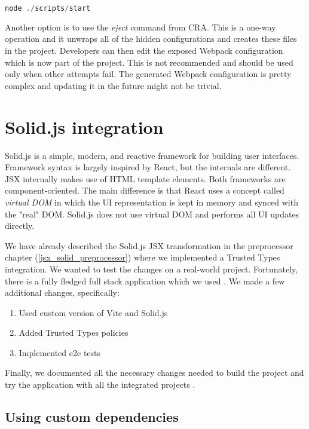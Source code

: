 \bigskip
\begin{lstlisting}[language=JavaScript, caption=Starting the CRA application]
node ./scripts/start
\end{lstlisting}

Another option is to use the \emph{eject} command from CRA. This is a one-way operation and it
unwraps all of the hidden configurations and creates these files in the project. Developers can then
edit the exposed Webpack configuration which is now part of the project. This is not recommended and
should be used only when other attempts fail. The generated Webpack configuration is pretty complex
and updating it in the future might not be trivial.

\section{Solid.js integration}
\label{section:solid}

Solid.js is a simple, modern, and reactive framework for building user interfaces. Framework
syntax is largely inspired by React, but the internals are different. JSX internally makes use of
HTML template elements. Both frameworks are component-oriented. The main difference is that React
uses a concept called \emph{virtual DOM} in which the UI representation is kept in memory and synced
with the "real" DOM. Solid.js does not use virtual DOM and performs all UI updates directly.

We have already described the Solid.js JSX transformation in the preprocessor chapter
(\ref{jsx_solid_preprocessor}) where we implemented a Trusted Types integration. We wanted to test
the changes on a real-world project. Fortunately, there is a fully fledged full stack application
which we used \cite{original_solid_realworld_project}. We made a few additional changes,
specifically:

\begin{enumerate}
  \item Used custom version of Vite and Solid.js
  \item Added Trusted Types policies
  \item Implemented e2e tests
\end{enumerate}

Finally, we documented all the necessary changes needed to build the project and try the application
with all the integrated projects \cite{solid_realworld_project:readme}.

\subsection{Using custom dependencies}

